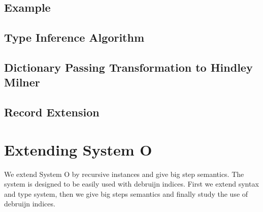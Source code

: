 \documentclass[runningheads]{llncs}
\begin{document}
\subsection{Example}
\subsection{Type Inference Algorithm}
\subsection{Dictionary Passing Transformation to Hindley Milner}
\subsection{Record Extension}
\section{Extending System O}
We extend System O by recursive instances and give big step semantics. The system is designed to be easily used with debruijn indices. First we extend syntax and type system, then we give big steps semantics and finally study the use of debruijn indices. 
\end{document}
